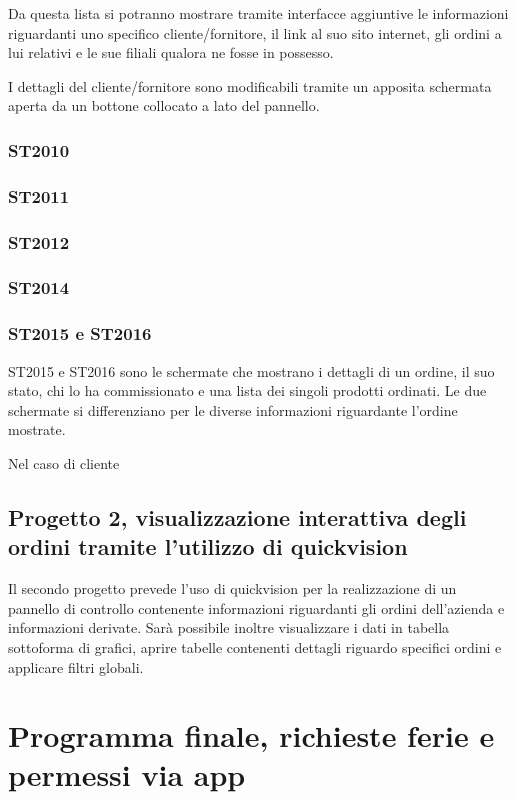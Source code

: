 \documentclass[target=bach,aauheader=,style=]{thud}
\begin{document}
Da questa lista si potranno mostrare tramite interfacce aggiuntive le informazioni riguardanti uno specifico cliente/fornitore, il link al suo sito internet, gli ordini a lui relativi e le sue filiali qualora ne fosse in possesso.

I dettagli del cliente/fornitore sono modificabili tramite un apposita schermata aperta da un bottone collocato a lato del pannello.

\subsection{ST2010}
\subsection{ST2011}
\subsection{ST2012}
\subsection{ST2014}
\subsection{ST2015 e ST2016}
ST2015 e ST2016 sono le schermate che mostrano i dettagli di un ordine, il suo stato, chi lo ha commissionato e una lista dei singoli prodotti ordinati.
Le due schermate si differenziano per le diverse informazioni riguardante l'ordine mostrate.

Nel caso di cliente 


\section{Progetto 2, visualizzazione interattiva degli ordini tramite l'utilizzo di quickvision}
Il secondo progetto prevede l'uso di quickvision per la realizzazione di un pannello di controllo contenente informazioni riguardanti gli ordini dell'azienda e informazioni derivate. 
Sarà possibile inoltre visualizzare i dati in tabella sottoforma di grafici, aprire tabelle contenenti dettagli riguardo specifici ordini e applicare filtri globali.



\chapter{Programma finale, richieste ferie e permessi via app}
\end{document}
